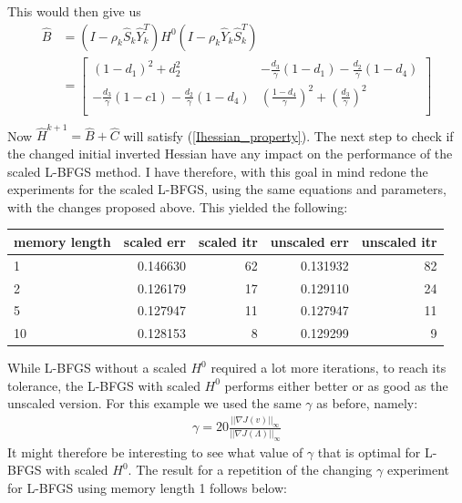\documentclass[11pt,a4paper]{article}
\begin{document}
This would then give us 
\begin{align*}
\hat{B} &= (I-\rho_k\hat{S}_k\hat{Y}_k^T)H^0(I-\rho_k\hat{Y}_k\hat{S}_k^T)  \\
&=\left[ \begin{array}{cc}
   	(1-d_1)^2 + d_2^2& -\frac{d_3}{\gamma}(1-d_1) -\frac{d_2}{\gamma}(1-d_4)\\
    	-\frac{d_3}{\gamma}(1-c1)-\frac{d_2}{\gamma}(1-d_4)& (\frac{1-d_4}{\gamma})^2 +(\frac{d_3}{\gamma})^2\\
   \end{array}  \right] \\
\end{align*}
Now $\hat{H}^{k+1}=\hat{B}+\hat{C}$ will satisfy (\ref{Ihessian_property}). The next step to check if the changed initial inverted Hessian have any impact on the performance of the scaled L-BFGS method. I have therefore, with this goal in mind redone the experiments for the scaled L-BFGS, using the same equations and parameters, with the changes proposed above. This yielded the following:
\\
\begin{tabular}{lrrrr}
\toprule
{} memory length &  scaled err &  scaled itr &  unscaled err &  unscaled itr \\
\midrule
1  &    0.146630 &          62 &      0.131932 &            82 \\
2  &    0.126179 &          17 &      0.129110 &            24 \\
5  &    0.127947 &          11 &      0.127947 &            11 \\
10 &    0.128153 &           8 &      0.129299 &             9 \\
\bottomrule
\end{tabular}
While L-BFGS without a scaled $H^0$ required a lot more iterations, to reach its tolerance, the L-BFGS with scaled $H^0$ performs either better or as good as the unscaled version. For this example we used the same $\gamma$ as before, namely:
\begin{align*}
\gamma = 20\frac{||\nabla J(v)||_{\infty}}{||\nabla J(\Lambda)||_{\infty}}
\end{align*}
It might therefore be interesting to see what value of $\gamma$ that is optimal for L-BFGS with scaled $H^0$. The result for a repetition of the changing $\gamma$ experiment for L-BFGS using memory length 1 follows below:
\\
\end{document}
